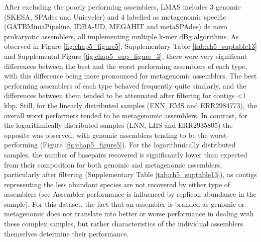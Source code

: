 After excluding the poorly performing assemblers, LMAS includes 3 genomic (SKESA, SPAdes and Unicycler) and 4 labelled as metagenomic specific (GATBMiniaPipeline, IDBA-UD, MEGAHIT and metaSPAdes) de novo prokaryotic assemblers, all implementing multiple k-mer \ac{dBg} algorithms. As observed in Figure \ref{fig:chap5_figure5}, Supplementary Table \ref{tab:ch5_suptable13} and Supplemental Figure \ref{fig:chap5_sup_figure_3},  there were very significant differences between the best and the worst performing assemblers of each type, with this difference being more pronounced for metagenomic assemblers. The best performing assemblers of each type behaved frequently quite similarly, and the differences between them tended to be attenuated after filtering for contigs <1 k\ac{bp}. Still, for the linearly distributed samples (ENN, EMS and ERR2984773), the overall worst performers tended to be metagenomic assemblers. In contrast, for the logarithmically distributed samples (LNN, LHS and ERR2935805) the opposite was observed, with genomic assemblers tending to be the worst-performing (Figure \ref{fig:chap5_figure5}). For the logarithmically distributed samples, the number of basepairs recovered is significantly lower than expected from their composition for both genomic and metagenomic assemblers, particularly after filtering (Supplementary Table \ref{tab:ch5_suptable13}), as contigs representing the less abundant species are not recovered by either type of assemblers (see Assembler performance is influenced by replicon abundance in the sample). For this dataset, the fact that an assembler is branded as genomic or metagenomic does not translate into better or worse performance in dealing with these complex samples, but rather characteristics of the individual assemblers themselves determine their performance.

